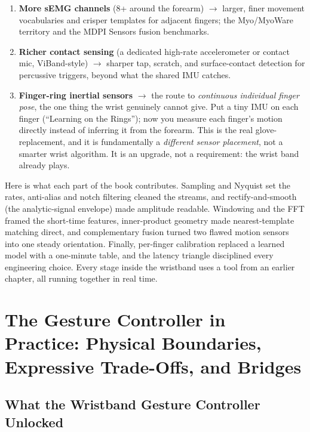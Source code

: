 \begin{enumerate}
  \item \textbf{More sEMG channels} (8+ around the forearm) $\to$ larger, finer
        movement vocabularies and crisper templates for adjacent fingers; the
        Myo/MyoWare territory and the MDPI Sensors fusion benchmarks.
  \item \textbf{Richer contact sensing} (a dedicated high-rate accelerometer or
        contact mic, ViBand-style) $\to$ sharper tap, scratch, and surface-contact
        detection for percussive triggers, beyond what the shared IMU catches.
  \item \textbf{Finger-ring inertial sensors} $\to$ the route to \emph{continuous
        individual finger pose}, the one thing the wrist genuinely cannot give.
        Put a tiny IMU on each finger (``Learning on the Rings''); now you measure
        each finger's motion directly instead of inferring it from the forearm.
        This is the real glove-replacement, and it is fundamentally a
        \emph{different sensor placement}, not a smarter wrist algorithm. It is an
        upgrade, not a requirement: the wrist band already plays.
\end{enumerate}

\begin{aestheticbox}
Here is what each part of the book contributes. Sampling and Nyquist set the rates,
anti-alias and notch filtering cleaned the streams, and rectify-and-smooth (the
analytic-signal envelope) made amplitude readable. Windowing and the FFT
framed the short-time features, inner-product geometry made nearest-template
matching direct, and complementary fusion turned two flawed motion sensors into
one steady orientation. Finally, per-finger calibration replaced a learned model with a
one-minute table, and the latency triangle disciplined every engineering
choice. Every stage inside the wristband uses a tool from an
earlier chapter, all running together in real time.
\end{aestheticbox}

\section{The Gesture Controller in Practice: Physical Boundaries, Expressive Trade-Offs, and Bridges}
\label{ch41:capabilities-road-ahead}

\subsection{What the Wristband Gesture Controller Unlocked}

